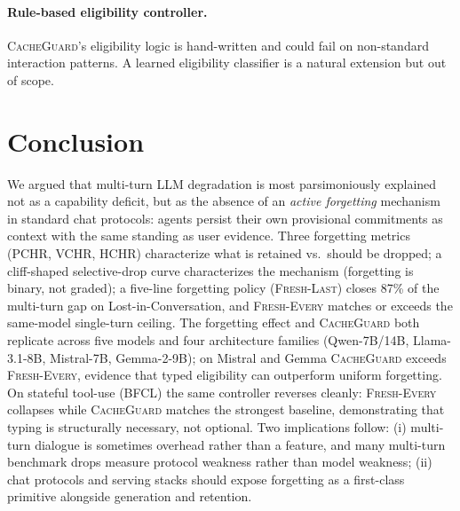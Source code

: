 \documentclass{article}
\begin{document}
\paragraph{Rule-based eligibility controller.}
\textsc{CacheGuard}'s eligibility logic is hand-written and could fail on non-standard interaction patterns. A learned eligibility classifier is a natural extension but out of scope.

\section{Conclusion}
\label{sec:conclusion}

We argued that multi-turn LLM degradation is most parsimoniously explained not as a capability deficit, but as the absence of an \emph{active forgetting} mechanism in standard chat protocols: agents persist their own provisional commitments as context with the same standing as user evidence. Three forgetting metrics (PCHR, VCHR, HCHR) characterize what is retained vs.\ should be dropped; a cliff-shaped selective-drop curve characterizes the mechanism (forgetting is binary, not graded); a five-line forgetting policy (\textsc{Fresh-Last}) closes 87\% of the multi-turn gap on Lost-in-Conversation, and \textsc{Fresh-Every} matches or exceeds the same-model single-turn ceiling. The forgetting effect and \textsc{CacheGuard} both replicate across five models and four architecture families (Qwen-7B/14B, Llama-3.1-8B, Mistral-7B, Gemma-2-9B); on Mistral and Gemma \textsc{CacheGuard} exceeds \textsc{Fresh-Every}, evidence that typed eligibility can outperform uniform forgetting. On stateful tool-use (BFCL) the same controller reverses cleanly: \textsc{Fresh-Every} collapses while \textsc{CacheGuard} matches the strongest baseline, demonstrating that typing is structurally necessary, not optional. Two implications follow: (i) multi-turn dialogue is sometimes overhead rather than a feature, and many multi-turn benchmark drops measure protocol weakness rather than model weakness; (ii) chat protocols and serving stacks should expose forgetting as a first-class primitive alongside generation and retention.




\appendix
\end{document}
